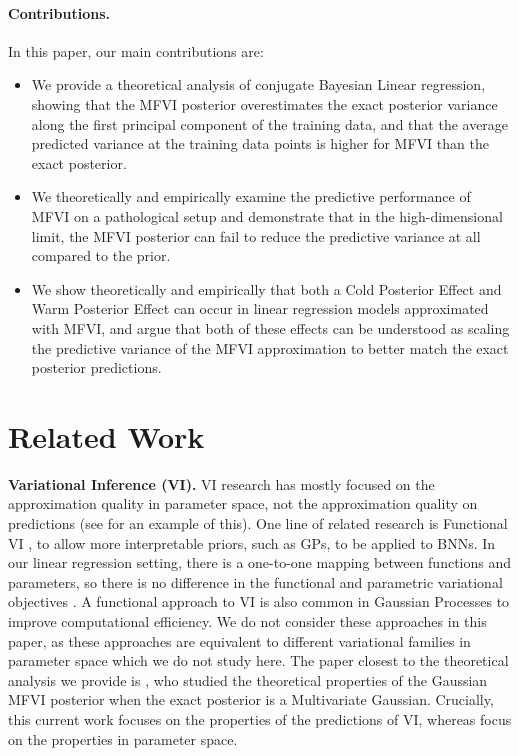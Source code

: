 \documentclass{article}
\theoremstyle{plain}
\theoremstyle{definition}
\theoremstyle{remark}
\theoremstyle{plain}
\begin{document}
\paragraph{Contributions.} In this paper, our main contributions are:
\begin{itemize}
    \item We provide a theoretical analysis of conjugate Bayesian Linear regression, showing that the MFVI posterior overestimates the exact posterior variance along the first principal component of the training data, and that the average predicted variance at the training data points is higher for MFVI than the exact posterior. 
    \item We theoretically and empirically examine the predictive performance of MFVI on a pathological setup and demonstrate that in the high-dimensional limit, the MFVI posterior can fail to reduce the predictive variance at all compared to the prior.
    \item We show theoretically and empirically that both a Cold Posterior Effect and Warm Posterior Effect can occur in linear regression models approximated with MFVI, and argue that both of these effects can be understood as scaling the predictive variance of the MFVI approximation to better match the exact posterior predictions. 
\end{itemize}

\section{Related Work}
\label{sec:background}

\textbf{Variational Inference (VI).}
VI research has mostly focused on the approximation quality in parameter space, not the approximation quality on predictions (see \citet{blei2017variational} for an example of this). 
One line of related research is Functional VI \cite{sun2019functional, burt2020understanding, cinquin2024regularized}, to allow more interpretable priors, such as GPs, to be applied to BNNs. In our linear regression setting, there is a one-to-one mapping between functions and parameters, so there is no difference in the functional and parametric variational objectives \citep[see Proposition 3,][]{burt2020understanding}.
A functional approach to VI is also common in Gaussian Processes \citep{titsias2009variational} to improve computational efficiency. We do not consider these approaches in this paper, as these approaches are equivalent to different variational families in parameter space which we do not study here.
The paper closest to the theoretical analysis we provide is \citet{margossian2023shrinkage}, who studied the theoretical properties of the Gaussian MFVI posterior when the exact posterior is a Multivariate Gaussian. Crucially, this current work focuses on the properties of the predictions of VI, whereas \citet{margossian2023shrinkage} focus on the properties in parameter space. 
\end{document}
